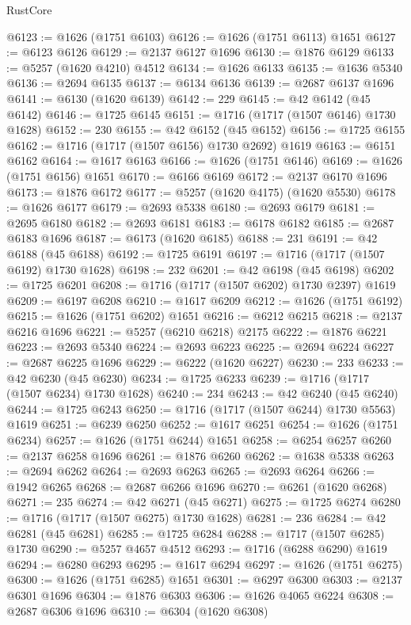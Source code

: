 \begin{lexlean}{RustCore}
\begin{coremodule}
@6123 := @1626 (@1751 @6103)
@6126 := @1626 (@1751 @6113) @1651
@6127 := @6123 @6126
@6129 := @2137 @6127 @1696
@6130 := @1876 @6129
@6133 := @5257 (@1620 @4210) @4512
@6134 := @1626 @6133
@6135 := @1636 @5340
@6136 := @2694 @6135
@6137 := @6134 @6136
@6139 := @2687 @6137 @1696
@6141 := @6130 (@1620 @6139)
@6142 := 229
@6145 := @42 @6142 (@45 @6142)
@6146 := @1725 @6145
@6151 := @1716 (@1717 (@1507 @6146) @1730 @1628)
@6152 := 230
@6155 := @42 @6152 (@45 @6152)
@6156 := @1725 @6155
@6162 := @1716 (@1717 (@1507 @6156) @1730 @2692) @1619
@6163 := @6151 @6162
@6164 := @1617 @6163
@6166 := @1626 (@1751 @6146)
@6169 := @1626 (@1751 @6156) @1651
@6170 := @6166 @6169
@6172 := @2137 @6170 @1696
@6173 := @1876 @6172
@6177 := @5257 (@1620 @4175) (@1620 @5530)
@6178 := @1626 @6177
@6179 := @2693 @5338
@6180 := @2693 @6179
@6181 := @2695 @6180
@6182 := @2693 @6181
@6183 := @6178 @6182
@6185 := @2687 @6183 @1696
@6187 := @6173 (@1620 @6185)
@6188 := 231
@6191 := @42 @6188 (@45 @6188)
@6192 := @1725 @6191
@6197 := @1716 (@1717 (@1507 @6192) @1730 @1628)
@6198 := 232
@6201 := @42 @6198 (@45 @6198)
@6202 := @1725 @6201
@6208 := @1716 (@1717 (@1507 @6202) @1730 @2397) @1619
@6209 := @6197 @6208
@6210 := @1617 @6209
@6212 := @1626 (@1751 @6192)
@6215 := @1626 (@1751 @6202) @1651
@6216 := @6212 @6215
@6218 := @2137 @6216 @1696
@6221 := @5257 (@6210 @6218) @2175
@6222 := @1876 @6221
@6223 := @2693 @5340
@6224 := @2693 @6223
@6225 := @2694 @6224
@6227 := @2687 @6225 @1696
@6229 := @6222 (@1620 @6227)
@6230 := 233
@6233 := @42 @6230 (@45 @6230)
@6234 := @1725 @6233
@6239 := @1716 (@1717 (@1507 @6234) @1730 @1628)
@6240 := 234
@6243 := @42 @6240 (@45 @6240)
@6244 := @1725 @6243
@6250 := @1716 (@1717 (@1507 @6244) @1730 @5563) @1619
@6251 := @6239 @6250
@6252 := @1617 @6251
@6254 := @1626 (@1751 @6234)
@6257 := @1626 (@1751 @6244) @1651
@6258 := @6254 @6257
@6260 := @2137 @6258 @1696
@6261 := @1876 @6260
@6262 := @1638 @5338
@6263 := @2694 @6262
@6264 := @2693 @6263
@6265 := @2693 @6264
@6266 := @1942 @6265
@6268 := @2687 @6266 @1696
@6270 := @6261 (@1620 @6268)
@6271 := 235
@6274 := @42 @6271 (@45 @6271)
@6275 := @1725 @6274
@6280 := @1716 (@1717 (@1507 @6275) @1730 @1628)
@6281 := 236
@6284 := @42 @6281 (@45 @6281)
@6285 := @1725 @6284
@6288 := @1717 (@1507 @6285) @1730
@6290 := @5257 @4657 @4512
@6293 := @1716 (@6288 @6290) @1619
@6294 := @6280 @6293
@6295 := @1617 @6294
@6297 := @1626 (@1751 @6275)
@6300 := @1626 (@1751 @6285) @1651
@6301 := @6297 @6300
@6303 := @2137 @6301 @1696
@6304 := @1876 @6303
@6306 := @1626 @4065 @6224
@6308 := @2687 @6306 @1696
@6310 := @6304 (@1620 @6308)

\end{coremodule}
\end{lexlean}
